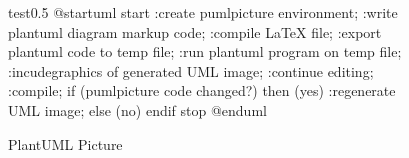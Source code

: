 \documentclass{article}
\begin{document}
\begin{figure}\centering
  
\begin{pumlpicture}{test}{0.5\textwidth}
  @startuml
  start
  :create pumlpicture environment;
  :write plantuml diagram markup code;
  :compile LaTeX file;
  :export plantuml code to temp file;
  :run plantuml program on temp file;
  :incudegraphics of generated UML image;
  :continue editing;
  :compile;
  if (pumlpicture code changed?) then (yes)
  :regenerate UML image;
  else (no)
  endif
  stop
  @enduml
\end{pumlpicture}

\caption{PlantUML Picture}
\label{fig:puml-pic}
\end{figure}
\end{document}
